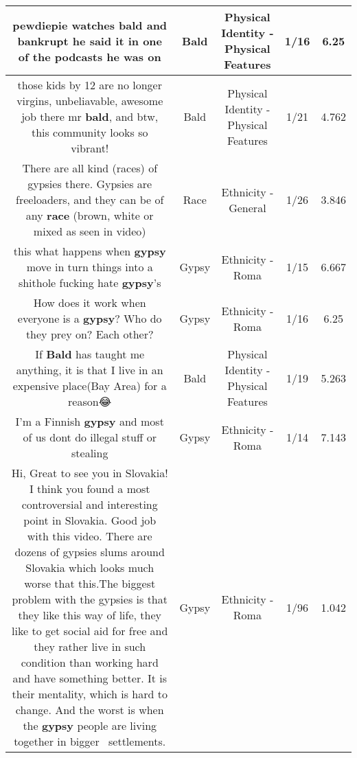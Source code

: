 \documentclass[11pt]{article}
\newlength\mylength
\begin{document}
\begin{center}
\begin{longtable}{|C{.65\mylength}|C{.30\mylength}|C{.12\mylength}|C{.12\mylength}|C{.12\mylength}|}
  \small pewdiepie watches \textbf{bald} and bankrupt he said it in one of the podcasts he was on\normalsize   & Bald & Physical Identity - Physical Features & 1/16 & 6.25 \\  \hline
  \small those kids by 12 are no longer virgins, unbeliavable, awesome job there mr \textbf{bald}, and btw, this community looks so vibrant!\normalsize   & Bald & Physical Identity - Physical Features & 1/21 & 4.762 \\  \hline
  \small There are all kind (races) of gypsies there. Gypsies are freeloaders, and they can be of any \textbf{race} (brown, white or mixed as seen in video)\normalsize   & Race & Ethnicity - General & 1/26 & 3.846 \\  \hline
  \small this what happens when \textbf{gypsy} move in turn things into a shithole fucking hate \textbf{gypsy}'s\normalsize   & Gypsy & Ethnicity - Roma & 1/15 & 6.667 \\  \hline
  \small How does it work when everyone is a \textbf{gypsy}?  Who do they prey on?  Each other?\normalsize   & Gypsy & Ethnicity - Roma & 1/16 & 6.25 \\  \hline
  \small If \textbf{Bald} has taught me anything, it is that I live in an expensive place(Bay Area) for a reason😂\normalsize   & Bald & Physical Identity - Physical Features & 1/19 & 5.263 \\  \hline
  \small I'm a Finnish \textbf{gypsy} and most of us dont do illegal stuff or stealing\normalsize   & Gypsy & Ethnicity - Roma & 1/14 & 7.143 \\  \hline
  \small Hi, Great to see you in Slovakia! I think you found a most controversial and interesting point in Slovakia. Good job with this video. There are dozens of gypsies slums around Slovakia which looks much worse that this.The biggest problem with the gypsies is that they like this way of life, they like to get social aid for free and they rather live in such condition than working hard and have something better. It is their mentality, which is hard to change. And the worst is when the \textbf{gypsy} people are living together in bigger  settlements.\normalsize   & Gypsy & Ethnicity - Roma & 1/96 & 1.042 \\  \hline

\end{longtable}
\end{center}
\end{document}
